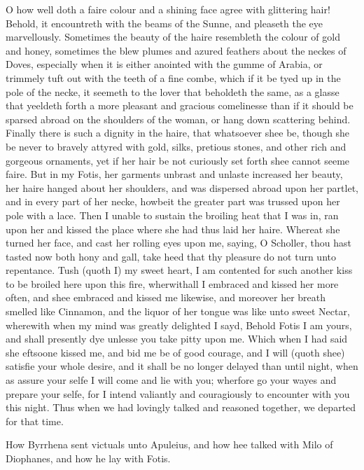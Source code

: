 O how well doth a faire colour and a shining face agree with glittering hair!
Behold, it encountreth with the beams of the Sunne, and pleaseth the eye
marvellously. Sometimes the beauty of the haire resembleth the colour of gold
and honey, sometimes the blew plumes and azured feathers about the neckes of
Doves, especially when it is either anointed with the gumme of Arabia, or
trimmely tuft out with the teeth of a fine combe, which if it be tyed up in the
pole of the necke, it seemeth to the lover that beholdeth the same, as a glasse
that yeeldeth forth a more pleasant and gracious comelinesse than if it should
be sparsed abroad on the shoulders of the woman, or hang down scattering
behind. Finally there is such a dignity in the haire, that whatsoever shee be,
though she be never to bravely attyred with gold, silks, pretious stones, and
other rich and gorgeous ornaments, yet if her hair be not curiously set forth
shee cannot seeme faire. But in my Fotis, her garments unbrast and unlaste
increased her beauty, her haire hanged about her shoulders, and was dispersed
abroad upon her partlet, and in every part of her necke, howbeit the greater
part was trussed upon her pole with a lace. Then I unable to sustain the
broiling heat that I was in, ran upon her and kissed the place where she had
thus laid her haire. Whereat she turned her face, and cast her rolling eyes
upon me, saying, O Scholler, thou hast tasted now both hony and gall, take heed
that thy pleasure do not turn unto repentance. Tush (quoth I) my sweet heart, I
am contented for such another kiss to be broiled here upon this fire,
wherwithall I embraced and kissed her more often, and shee embraced and kissed
me likewise, and moreover her breath smelled like Cinnamon, and the liquor of
her tongue was like unto sweet Nectar, wherewith when my mind was greatly
delighted I sayd, Behold Fotis I am yours, and shall presently dye unlesse you
take pitty upon me. Which when I had said she eftsoone kissed me, and bid me be
of good courage, and I will (quoth shee) satisfie your whole desire, and it
shall be no longer delayed than until night, when as assure your selfe I will
come and lie with you; wherfore go your wayes and prepare your selfe, for I
intend valiantly and couragiously to encounter with you this night. Thus when
we had lovingly talked and reasoned together, we departed for that time.


How Byrrhena sent victuals unto Apuleius, and how hee talked with Milo of
Diophanes, and how he lay with Fotis.


